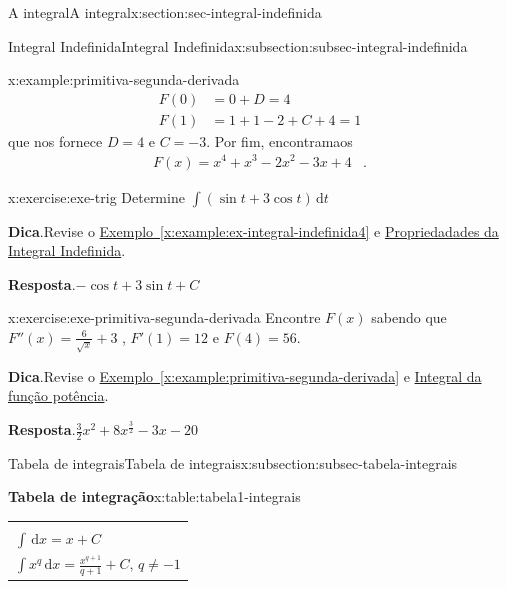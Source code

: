 \documentclass[oneside,10pt,]{article}
\newcommand{\blocktitlefont}{\relax}
\newcommand{\tabularfont}{\relax}
\newcommand{\xreffont}{\relax}
\numberwithin{equation}{section}
\newcommand{\hrulethin}  {\noalign{\hrule height 0.04em}}
\newcommand{\hrulethick} {\noalign{\hrule height 0.11em}}
\newcommand{\dd}{\mathrm{d}}
\newcommand{\integral}[2]{\displaystyle\int {#1}\,\dd {#2}}
\newcommand{\amp}{&}
\begin{document}
\begin{sectionptx}{A integral}{}{A integral}{}{}{x:section:sec-integral-indefinida}
\begin{subsectionptx}{Integral Indefinida}{}{Integral Indefinida}{}{}{x:subsection:subsec-integral-indefinida}
\begin{example}{}{x:example:primitiva-segunda-derivada}
\begin{align*}
F(0)  \amp = 0+D =4 \\
F(1) \amp = 1+ 1-2+C+4=1 
\end{align*}
que nos fornece \(D=4\) e \(C=-3\). Por fim, encontramaos%
\begin{align*}
F(x) = x^4+ x^3-2x^2-3x+4 \amp \text{.}
\end{align*}
%
\end{example}
\begin{inlineexercise}{}{x:exercise:exe-trig}%
Determine \(\integral{\left(\sin{t}+3\cos{t}\right)}{t}\)%
\par\smallskip%
\noindent\textbf{\blocktitlefont Dica}.\hypertarget{g:hint:idp26}{}\quad{}Revise o \hyperref[x:example:ex-integral-indefinida4]{Exemplo~{\xreffont\ref{x:example:ex-integral-indefinida4}}} e \hyperref[x:assemblage:thm-prop-integral-indefinida]{Propriedadades da Integral Indefinida}.%
\par\smallskip%
\noindent\textbf{\blocktitlefont Resposta}.\hypertarget{g:answer:idp27}{}\quad{}\(-\cos{t} + 3\sin{t} + C\)%
\end{inlineexercise}
\begin{inlineexercise}{}{x:exercise:exe-primitiva-segunda-derivada}%
Encontre \(F(x)\) sabendo que \(F''(x)=\frac{6}{\sqrt{x}} + 3\) , \(F'(1)=12\) e \(F(4)=56\).%
\par\smallskip%
\noindent\textbf{\blocktitlefont Dica}.\hypertarget{g:hint:idp28}{}\quad{}Revise  o \hyperref[x:example:primitiva-segunda-derivada]{Exemplo~{\xreffont\ref{x:example:primitiva-segunda-derivada}}} e \hyperref[x:assemblage:prob-integral-funcao-potencia]{Integral da função potência}.%
\par\smallskip%
\noindent\textbf{\blocktitlefont Resposta}.\hypertarget{g:answer:idp29}{}\quad{}\(\frac{3}{2}x^{2} + 8x^{\frac{3}{2}} - 3x - 20\)%
\end{inlineexercise}
\end{subsectionptx}
%
%
\typeout{************************************************}
\typeout{************************************************}
%
\begin{subsectionptx}{Tabela de integrais}{}{Tabela de integrais}{}{}{x:subsection:subsec-tabela-integrais}
\begin{tableptx}{\textbf{Tabela de integração}}{x:table:tabela1-integrais}{}%
\centering
{\tabularfont%
\begin{tabular}{l}\hrulethick
\multicolumn{1}{c}{Fórmula}\tabularnewline\hrulethin
\(\integral{}{x}=x+ C\)\tabularnewline[0pt]
\(\integral{x^q}{x}=\frac{x^{q+1}}{q+1} + C,\,q\neq -1\)\tabularnewline[0pt]

\end{tabular}}
\end{tableptx}
\end{subsectionptx}
\end{sectionptx}
\end{document}
